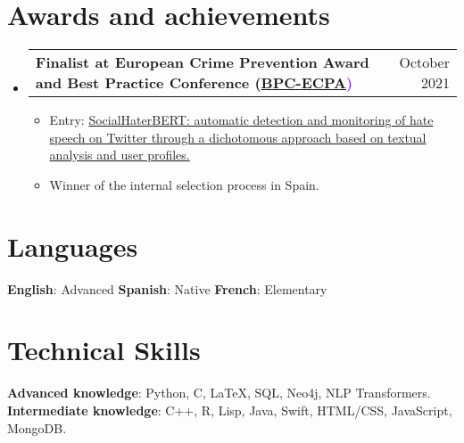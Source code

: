 \documentclass[letterpaper,11pt]{article}
\makeatletter
\newcommand{\resumeItem}[1]{
  \item\small{
    {#1 \vspace{-2pt}}
  }
}
\newcommand{\resumeProjectHeading}[2]{
    \item
    \begin{tabular*}{0.97\textwidth}{l@{\extracolsep{\fill}}r}
      \small#1 & #2 \\
    \end{tabular*}\vspace{-7pt}
}
\newcommand{\resumeSubHeadingListStart}{\begin{itemize}[leftmargin=0.15in, label={}]}
\newcommand{\resumeSubHeadingListEnd}{\end{itemize}}
\newcommand{\resumeItemListStart}{\begin{itemize}}
\newcommand{\resumeItemListEnd}{\end{itemize}\vspace{-5pt}}
\makeatother
\begin{document}
\section{Awards and achievements}
\resumeSubHeadingListStart
  \resumeProjectHeading
      {\textbf{Finalist at European Crime Prevention Award and Best Practice Conference (\textcolor{BlueViolet}{\href{https://eucpn.org/service/bpc-ecpa}{BPC-ECPA})} }}{October 2021}
      
      \resumeItemListStart
        \resumeItem{Entry: \textcolor{BlueViolet}{\href{https://eucpn.org/document/socialhaterbert-automatic-detection-and-monitoring-of-hate-speech-on-twitter-through-a}{SocialHaterBERT: automatic detection and monitoring of hate speech on Twitter through a dichotomous approach based on textual analysis and user profiles.}}}
        \resumeItem{Winner of the internal selection process in Spain.}
      \resumeItemListEnd
\resumeSubHeadingListEnd
\section{Languages}
 \begin{itemize}[leftmargin=0.15in, label={}]
    \small{\item{
     \textbf{English}{: Advanced}\hspace{1em}
     \textbf{Spanish}{: Native}\hspace{1em}
     \textbf{French}{: Elementary} 
    }}
 \end{itemize}



%
\section{Technical Skills}
 \begin{itemize}[leftmargin=0.15in, label={}]
    \small{\item{
     \textbf{Advanced knowledge}{: Python, C, \LaTeX, SQL, Neo4j, NLP Transformers.} \\
     \textbf{Intermediate knowledge}{: C++, R, Lisp, Java, Swift, HTML/CSS, JavaScript, MongoDB.}
    }}
 \end{itemize}


\end{document}
